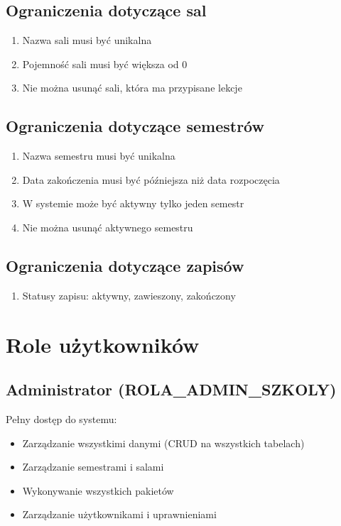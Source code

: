 \documentclass[12pt,a4paper]{article}
\begin{document}
\subsection{Ograniczenia dotyczące sal}
\begin{enumerate}[nosep]
    \item Nazwa sali musi być unikalna
    \item Pojemność sali musi być większa od 0
    \item Nie można usunąć sali, która ma przypisane lekcje
\end{enumerate}

\subsection{Ograniczenia dotyczące semestrów}
\begin{enumerate}[nosep]
    \item Nazwa semestru musi być unikalna
    \item Data zakończenia musi być późniejsza niż data rozpoczęcia
    \item W systemie może być aktywny tylko jeden semestr
    \item Nie można usunąć aktywnego semestru
\end{enumerate}

\subsection{Ograniczenia dotyczące zapisów}
\begin{enumerate}[nosep]
    \item Statusy zapisu: aktywny, zawieszony, zakończony
\end{enumerate}

\section{Role użytkowników}

\subsection{Administrator (ROLA\_ADMIN\_SZKOLY)}
Pełny dostęp do systemu:
\begin{itemize}[nosep]
    \item Zarządzanie wszystkimi danymi (CRUD na wszystkich tabelach)
    \item Zarządzanie semestrami i salami
    \item Wykonywanie wszystkich pakietów
    \item Zarządzanie użytkownikami i uprawnieniami
\end{itemize}
\end{document}
